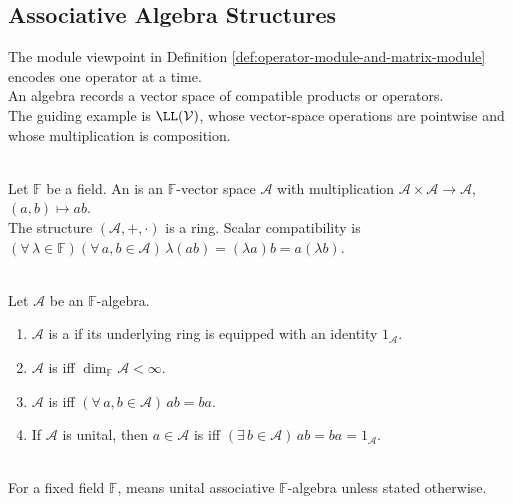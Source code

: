 \subsection{Associative Algebra Structures}


The module viewpoint in Definition \ref{def:operator-module-and-matrix-module} encodes one operator at a time.\\
An algebra records a vector space of compatible products or operators.\\
The guiding example is $\LL(\mathcal{V})$, whose vector-space operations are pointwise and whose multiplication is composition.

\begin{definition} \label{def:algebra-over-field} \\
Let $\mathbb{F}$ be a field. An  is an $\mathbb{F}$-vector space $\mathcal{A}$ with multiplication $\mathcal{A}\times\mathcal{A}\to\mathcal{A}$, $(a,b)\mapsto ab$.\\
The structure $(\mathcal{A},+,\cdot)$ is a ring. Scalar compatibility is $(\forall\,\lambda\in\mathbb{F})(\forall\,a,b\in\mathcal{A})\,\lambda(ab)=(\lambda a)b=a(\lambda b)$.
\end{definition}

\begin{definition} \label{def:unital-associative-algebra} \\
Let $\mathcal{A}$ be an $\mathbb{F}$-algebra.
\begin{enumerate}[label=(\roman*)]
\setlength{\itemsep}{0pt}
\item $\mathcal{A}$ is a  if its underlying ring is equipped with an identity $1_{\mathcal{A}}$.
\item $\mathcal{A}$ is  iff $\dim_{\mathbb{F}}\mathcal{A}<\infty$.
\item $\mathcal{A}$ is  iff $(\forall\,a,b\in\mathcal{A})\,ab=ba$.
\item If $\mathcal{A}$ is unital, then $a\in\mathcal{A}$ is  iff $(\exists\,b\in\mathcal{A})\,ab=ba=1_{\mathcal{A}}$.
\end{enumerate}
\end{definition}

\begin{convention} \label{conv:algebra-convention-relative-to-ring-definition} \\
For a fixed field $\mathbb{F}$,  means unital associative $\mathbb{F}$-algebra unless stated otherwise.
\end{convention}

